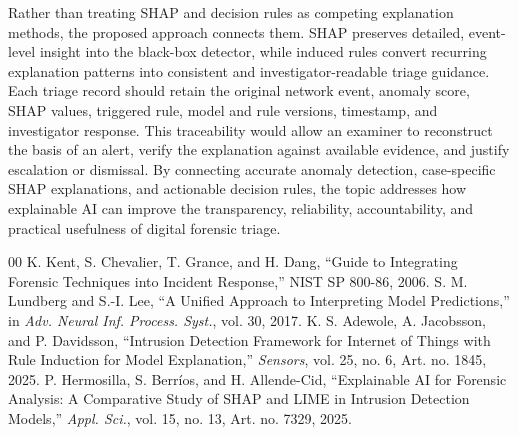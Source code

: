 \documentclass[conference]{IEEEtran}
\begin{document}
Rather than treating SHAP and decision rules as competing explanation methods, the proposed approach connects them. SHAP preserves detailed, event-level insight into the black-box detector, while induced rules convert recurring explanation patterns into consistent and investigator-readable triage guidance. Each triage record should retain the original network event, anomaly score, SHAP values, triggered rule, model and rule versions, timestamp, and investigator response. This traceability would allow an examiner to reconstruct the basis of an alert, verify the explanation against available evidence, and justify escalation or dismissal. By connecting accurate anomaly detection, case-specific SHAP explanations, and actionable decision rules, the topic addresses how explainable AI can improve the transparency, reliability, accountability, and practical usefulness of digital forensic triage.


\begin{thebibliography}{00}
 K. Kent, S. Chevalier, T. Grance, and H. Dang, ``Guide to Integrating Forensic Techniques into Incident Response,'' NIST SP 800-86, 2006.
 S. M. Lundberg and S.-I. Lee, ``A Unified Approach to Interpreting Model Predictions,'' in \emph{Adv. Neural Inf. Process. Syst.}, vol. 30, 2017.
 K. S. Adewole, A. Jacobsson, and P. Davidsson, ``Intrusion Detection Framework for Internet of Things with Rule Induction for Model Explanation,'' \emph{Sensors}, vol. 25, no. 6, Art. no. 1845, 2025.
 P. Hermosilla, S. Berr\'ios, and H. Allende-Cid, ``Explainable AI for Forensic Analysis: A Comparative Study of SHAP and LIME in Intrusion Detection Models,'' \emph{Appl. Sci.}, vol. 15, no. 13, Art. no. 7329, 2025.
\end{thebibliography}
\end{document}

